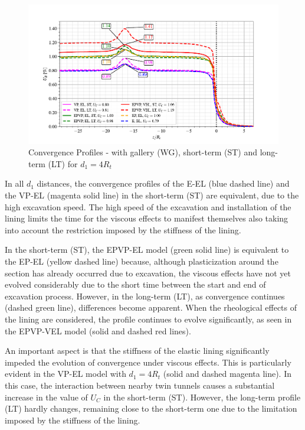 \documentclass[a4paper,fleqn]{cas-sc}
\begin{document}
\begin{figure}[h!]
	\centering
	\includegraphics[scale=0.9]{Convergence Profiles - WG_ST_LT - $d_1=4R_i$_anotate.pdf}
	\caption{Convergence Profiles - with gallery (WG), short-term (ST) and long-term (LT) for $d_1 = 4R_t$}
	\label{WG-ST-LT-D1-4RI}
\end{figure}
\FloatBarrier
In all $d_1$ distances, the convergence profiles of the E-EL (blue dashed line) and the VP-EL (magenta solid line) in the short-term (ST) are equivalent, due to the high excavation speed. The high speed of the excavation and installation of the lining limits the time for the viscous effects to manifest themselves also taking into account the restriction imposed by the stiffness of the lining.

In the short-term (ST), the EPVP-EL model (green solid line) is equivalent to the EP-EL (yellow dashed line) because, although plasticization around the section has already occurred due to excavation, the viscous effects have not yet evolved considerably due to the short time between the start and end of excavation process. However, in the long-term (LT), as convergence continues (dashed green line), differences become apparent. When the rheological effects of the lining are considered, the profile continues to evolve significantly, as seen in the EPVP-VEL model (solid and dashed red lines).

An important aspect is that the stiffness of the elastic lining significantly impeded the evolution of convergence under viscous effects. This is particularly evident in the VP-EL model with $d_1=4R_t$ (solid and dashed magenta line). In this case, the interaction between nearby twin tunnels causes a substantial increase in the value of $U_{C}$ in the short-term (ST). However, the long-term profile (LT) hardly changes, remaining close to the short-term one due to the limitation imposed by the stiffness of the lining.
\end{document}
